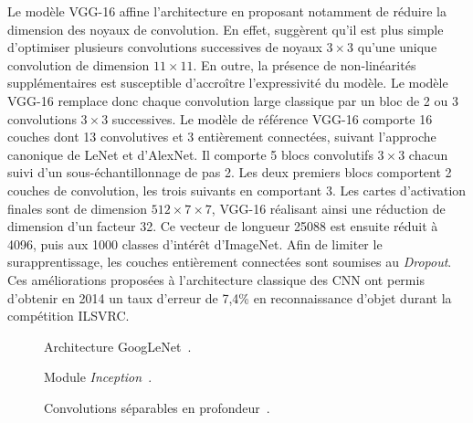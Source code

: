 Le modèle VGG-16 affine l'architecture en proposant notamment de réduire la dimension des noyaux de convolution. En effet, \citet{chatfield_return_2014,simonyan_very_2014} suggèrent qu'il est plus simple d'optimiser plusieurs convolutions successives de noyaux $3\times3$ qu'une unique convolution de dimension $11\times11$. En outre, la présence de non-linéarités supplémentaires est susceptible d'accroître l'expressivité du modèle. Le modèle VGG-16 remplace donc chaque convolution large classique par un bloc de 2 ou 3 convolutions $3\times3$ successives. Le modèle de référence VGG-16 comporte 16 couches dont 13 convolutives et 3 entièrement connectées, suivant l'approche canonique de LeNet et d'AlexNet. Il comporte 5 blocs convolutifs $3\times3$ chacun suivi d'un sous-échantillonnage de pas 2. Les deux premiers blocs comportent 2 couches de convolution, les trois suivants en comportant 3. Les cartes d'activation finales sont de dimension $512\times7\times7$, VGG-16 réalisant ainsi une réduction de dimension d'un facteur 32. Ce vecteur de longueur 25088 est ensuite réduit à 4096, puis aux 1000 classes d'intérêt d'ImageNet. Afin de limiter le surapprentissage, les couches entièrement connectées sont soumises au \emph{Dropout}. Ces améliorations proposées à l'architecture classique des \gls{CNN} ont permis d'obtenir en 2014 un taux d'erreur de 7,4\% en reconnaissance d'objet durant la compétition \gls{ILSVRC}.

\begin{figure}[t]
  \resizebox{\textwidth}{!}{
    
  }
  \caption[Architecture GoogLeNet.]{Architecture GoogLeNet~\cite{szegedy_going_2015}.}
  \label{fig:googlenet}
\end{figure}

\begin{figure}
  \begin{minipage}{0.48\textwidth}
    \resizebox{\textwidth}{!}{
      
    }
    \caption[Module \emph{Inception}.]{Module \emph{Inception}~\cite{szegedy_going_2015}.}
    \label{fig:inception}
  \end{minipage}
  \hfill
  \begin{minipage}{0.48\textwidth}
    \resizebox{\textwidth}{!}{
      
    }
    \caption[Convolutions séparables en profondeur.]{Convolutions séparables en profondeur~\cite{chollet_xception_2017}.}
    \label{fig:depthwise}
  \end{minipage}
\end{figure}

